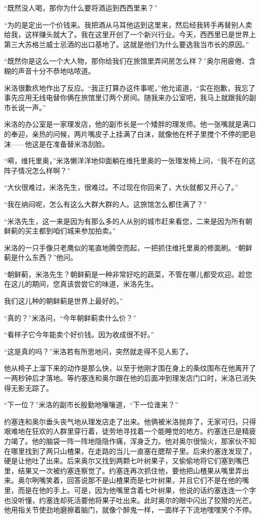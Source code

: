     “既然没人喝，那你为什么要将酒运到西西里来？”

    “为的是定出一个价钱来。我把酒从马耳他运到这里来，然后经我转手再替别人卖给我，这样赚头就大了。我在这里开创了一个新兴行业。今天，西西里已是世界上第三大苏格兰威士忌酒的出口基地了。这就是他们为什么要选我当市长的原因。”

    “既然你是这么一个大人物，那你给我们在旅馆里弄间房怎么样？”奥尔用疲倦、含糊的声音十分不恭地咕哝道。

    米洛很歉疚地作出了反应。“我正打算办这件事呢，”他允诺道，“实在抱歉，我忘了事先应用无线电替你俩在旅馆里订两个房间。随我来办公室吧，我马上就跟我的副市长说一声。”

    米洛的办公室是一家理发店，他的副市长是一个矮胖的理发师。他一张嘴就是满口的奉迎，亲热的问候，两片嘴皮子上挂满了白沫，就像他在杯子里搅个不停的肥皂沫——他这是在准备替米洛刮脸。

    “嗬，维托里奥，”米洛懒洋洋地仰面躺在维托里奥的一张理发椅上问，“我不在的这阵子情况怎么样啊？”

    “大伙很难过，米洛先生，很难过。不过现在你回来了，大伙就都又开心了。”

    “我在纳闷呢，怎么有这么大群大群的人。这旅馆怎么都住满了？”

    “米洛先生，这一来是因为有那么多的人从别的城市赶来看您，二来是因为所有朝鲜蓟的买主都到咱们城来参加拍卖。”

    米洛的一只手像只老鹰似的笔直地腾空而起，一把抓住维托里奥的修面刷。“朝鲜蓟是什么东西？”他问。

    “朝鲜蓟，米洛先生？朝鲜蓟是一种非常好吃的蔬菜，不管在哪儿都受欢迎。趁您在这儿的期间，您真该尝尝它的味道，米洛先生。

    我们这儿种的朝鲜蓟是世界上最好的。”

    “真的？”米洛问，“今年朝鲜蓟卖什么价？”

    “看样子它今年能卖个好价钱。因为收成很不好。”

    “这是真的吗？”米洛若有所思地问，突然就走得不见人影了。

    他从椅子上溜下来的动作是那么快，以至于他刚才围在身上的条纹围布在他离开了一两秒钟后才落地。等约塞连和奥尔跟在他的后面冲到理发店门口时，米洛已消失得无影无踪了。

    “下一位？”米洛的副市长殷勤地嚷嚷道，“下一位谁来？”

    约塞连和奥尔垂头丧气地从理发店走了出来。他俩被米洛抛弃了，无家可归，只得艰难地在狂欢的人群里穿行着，徒劳地寻找着一个能睡觉的地方。约塞连已是精疲力竭了。他的脑袋一阵一阵地隐隐作痛，浑身乏力。他对奥尔很恼火，那家伙不知在哪里找到了两只山楂果，在走路的当儿一直塞在腮帮子里。后来约塞连发现了，硬是让他吐了出来。后来奥尔又找到两颗七叶树果子，又偷偷地将它们塞到嘴巴里，结果又一次被约塞连察觉了。约塞连再次抓住他，要他把山楂果从嘴里弄出来。奥尔咧嘴笑着，回答说那不是山楂果而是七叶树果，并且它们不是在他的嘴里，而是在他的手上。可是，因为他嘴里含着七叶树果，他说的话约塞连连一个字也没听懂，约塞连却死活要他将果子吐出来。此时奥尔的眼中闪出了狡猾的光芒。他用指关节使劲地磨擦着脑门，就像个醉鬼一样，一面样子下流地嘿嘿笑个不停。

